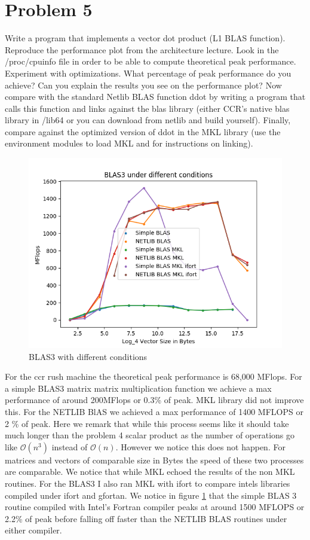 \documentclass[12pt]{article}
\theoremstyle{plain}
\theoremstyle{definition}
\begin{document}
\section*{Problem 5}
Write a program that implements a vector dot product (L1 BLAS function). Reproduce
the performance plot from the architecture lecture. Look in the /proc/cpuinfo file in
order to be able to compute theoretical peak performance. Experiment with optimizations.
What percentage of peak performance do you achieve? Can you explain the results
you see on the performance plot?
Now compare with the standard Netlib BLAS function ddot by writing a program that
calls this function and links against the blas library (either CCR’s native blas library in
/lib64 or you can download from netlib and build yourself).
Finally, compare against the optimized version of ddot in the MKL library (use the
environment modules to load MKL and for instructions on linking).

\begin{figure}  
\label{fig:problem5}
\includegraphics[scale=0.7]{problem5.png}
\caption{BLAS3 with different conditions}
\end{figure}

For the ccr rush machine the theoretical peak performance is 68,000 MFlops. For a simple BLAS3 matrix matrix multiplication function we achieve a max performance of around 200MFlops or 0.3\% of peak. MKL library did not improve this. For the NETLIB BlAS we achieved a max performance of 1400 MFLOPS or 2 \% of peak. Here we remark that while this process seems like it should take much longer than the problem 4 scalar product as the number of operations go like $\mathcal{O}(n^3)$ instead of $\mathcal{O}(n)$. However we notice this does not happen. For matrices and vectors of comparable size in Bytes the speed of these two processes are comparable. We notice that while MKL echoed the results of the non MKL routines. For the BLAS3 I also ran MKL with ifort to compare intels libraries compiled under ifort and gfortan. We notice in figure \ref{fig:problem5} that the simple BLAS 3 routine compiled with Intel's Fortran compiler peaks at around 1500 MFLOPS or 2.2\% of peak before falling off faster than the NETLIB BLAS routines under either compiler.  
\end{document}
